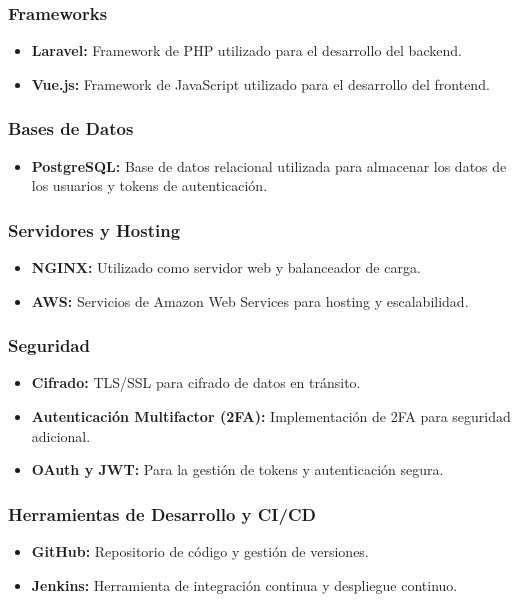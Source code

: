 \subsubsection{Frameworks}
\begin{itemize}
    \item \textbf{Laravel:} Framework de PHP utilizado para el desarrollo del backend.
    \item \textbf{Vue.js:} Framework de JavaScript utilizado para el desarrollo del frontend.
\end{itemize}

\subsubsection{Bases de Datos}
\begin{itemize}
    \item \textbf{PostgreSQL:} Base de datos relacional utilizada para almacenar los datos de los usuarios y tokens de autenticación.
\end{itemize}

\subsubsection{Servidores y Hosting}
\begin{itemize}
    \item \textbf{NGINX:} Utilizado como servidor web y balanceador de carga.
    \item \textbf{AWS:} Servicios de Amazon Web Services para hosting y escalabilidad.
\end{itemize}

\subsubsection{Seguridad}
\begin{itemize}
    \item \textbf{Cifrado:} TLS/SSL para cifrado de datos en tránsito.
    \item \textbf{Autenticación Multifactor (2FA):} Implementación de 2FA para seguridad adicional.
    \item \textbf{OAuth y JWT:} Para la gestión de tokens y autenticación segura.
\end{itemize}

\subsubsection{Herramientas de Desarrollo y CI/CD}
\begin{itemize}
    \item \textbf{GitHub:} Repositorio de código y gestión de versiones.
    \item \textbf{Jenkins:} Herramienta de integración continua y despliegue continuo.
\end{itemize}


